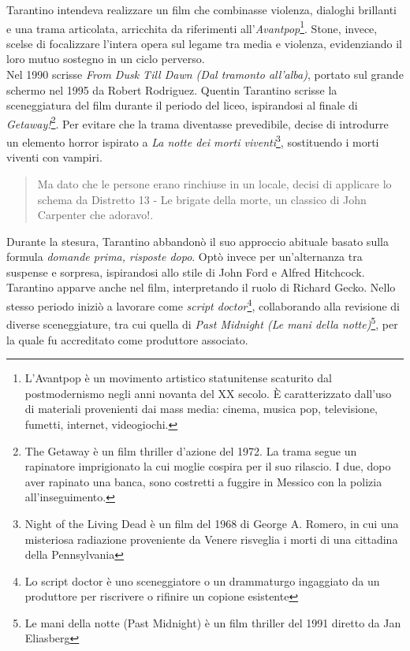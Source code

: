 \documentclass[12pt]{article} %
\begin{document}
\begin{flushleft}
    Tarantino intendeva realizzare un film che combinasse violenza, dialoghi brillanti e una trama articolata, arricchita da riferimenti all’\textit{Avantpop}\footnote{L'Avantpop  è un movimento artistico statunitense scaturito dal postmodernismo negli anni novanta del XX secolo.
    È caratterizzato dall'uso di materiali provenienti dai mass media: cinema, musica pop, televisione, fumetti, internet, videogiochi.}. Stone, invece, scelse di focalizzare l’intera opera sul legame tra media e violenza, evidenziando il loro mutuo sostegno in un ciclo perverso.
    \\\vspace{2cm}Nel 1990 scrisse \textit{From Dusk Till Dawn (Dal tramonto all'alba)}, portato sul grande schermo nel 1995 da Robert Rodriguez. 
    Quentin Tarantino scrisse la sceneggiatura del film durante il periodo del liceo, ispirandosi al finale di \textit{Getaway!}\footnote{The Getaway è un film thriller d'azione del 1972. La trama segue un rapinatore imprigionato la cui moglie cospira per il suo rilascio. I due, dopo aver rapinato una banca, sono costretti a fuggire in Messico con la polizia all'inseguimento.}.
    Per evitare che la trama diventasse prevedibile, decise di introdurre un elemento horror ispirato a \textit{La notte dei morti viventi}\footnote{Night of the Living Dead è un film del 1968 di George A. Romero, in cui una misteriosa radiazione proveniente da Venere risveglia i morti di una cittadina della Pennsylvania}, sostituendo i morti viventi con vampiri. 
    \begin{quote}Ma dato che le persone erano rinchiuse in un locale, decisi di applicare lo schema da Distretto 13 - Le brigate della morte, un classico di John Carpenter che adoravo!.\end{quote}
    Durante la stesura, Tarantino abbandonò il suo approccio abituale basato sulla formula \textit{domande prima, risposte dopo}. Optò invece per un’alternanza tra suspense e sorpresa, ispirandosi allo stile di John Ford e Alfred Hitchcock.
    Tarantino apparve anche nel film, interpretando il ruolo di Richard Gecko. Nello stesso periodo iniziò a lavorare come \textit{script doctor}\footnote{Lo script doctor è uno sceneggiatore o un drammaturgo ingaggiato da un produttore per riscrivere o rifinire un copione esistente}, collaborando alla revisione di diverse sceneggiature, tra cui quella di \textit{Past Midnight (Le mani della notte)}\footnote{Le mani della notte (Past Midnight) è un film thriller del 1991 diretto da Jan Eliasberg}, per la quale fu accreditato come produttore associato.
\end{flushleft}
\break
\end{document}
